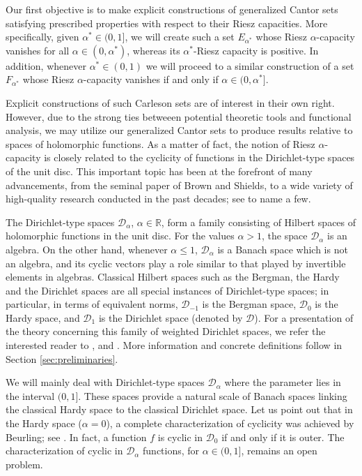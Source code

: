 \documentclass[12pt]{amsart}
\theoremstyle{definition}\newtheorem{remark}[theorem]{Remark}
\theoremstyle{definition}\newtheorem{example}[theorem]{Example}
\theoremstyle{definition}\newtheorem{definition}{Definition}
\numberwithin{equation}{section}
\newcommand\cD{{\mathcal D}}
\newcommand\RR{{\mathbb R}}
\newcommand\DDD{{\mathcal D}}
\begin{document}
Our first objective is to make explicit constructions of generalized Cantor sets satisfying prescribed properties with respect to their Riesz capacities. More specifically, given $\alpha^*\in(0,1]$, we will create such a set $E_{\alpha^*}$ whose Riesz $\alpha$-capacity vanishes for all $\alpha\in (0,\alpha^*)$, whereas its $\alpha^*$-Riesz capacity is positive. In addition, whenever $\alpha^*\in(0,1)$ we will proceed to a similar construction of a set $F_{\alpha^*}$ whose Riesz $\alpha$-capacity vanishes if and only if $\alpha\in(0,\alpha^*]$.

Explicit constructions of such Carleson sets are of interest in their own right. However, due to the strong ties betweeen potential theoretic tools and functional analysis, we may utilize our generalized Cantor sets to produce results relative to spaces of holomorphic functions. As a matter of fact, the notion of Riesz $\alpha$-capacity is closely related to the cyclicity of functions in the Dirichlet-type spaces of the unit disc. This important topic has been at the forefront of many advancements, from the seminal paper \cite{Brown-Shields} of Brown and Shields, to a wide variety of high-quality research conducted in the past decades; see \cite{Brown-Cohn,Primer,EFKR,EFKR2,EFKR*} to name a few. 

The Dirichlet-type spaces $\cD_\alpha$, $\alpha\in \RR$, form a family consisting of Hilbert spaces of holomorphic functions in the unit disc. For the values $\alpha>1$, the space $\cD_\alpha$ is an algebra. On the other hand, whenever $\alpha\leq 1$, $\mathcal{D}_\alpha$ is a Banach space which is not an algebra, and its cyclic vectors play a role similar to that played by invertible elements in algebras.  Classical Hilbert spaces such as the Bergman, the Hardy and the Dirichlet spaces are all special instances of Dirichlet-type spaces; in particular, in terms of equivalent norms, $\cD_{-1}$ is the Bergman space, $\cD_0$ is the Hardy space, and $\cD_1$ is the Dirichlet space (denoted by $\DDD$). For a presentation of the theory concerning this family of weighted Dirichlet spaces, we refer the interested reader to \cite{Aleman1}, \cite{Brown-Shields} and \cite[Chapter 1]{Primer}. More information and concrete definitions follow in Section \ref{sec:preliminaries}.

We will mainly deal with Dirichlet-type spaces $\mathcal{D}_\alpha$ where the parameter lies in the interval $(0,1]$. These spaces provide a natural scale of Banach spaces linking the classical Hardy space to the classical Dirichlet space. Let us point out that in the Hardy space ($\alpha=0$), a complete characterization of cyclicity was achieved by Beurling; see \cite{Beurling}. In fact, a function $f$ is cyclic in $\mathcal{D}_0$ if and only if it is outer. The characterization of cyclic in $\cD_\alpha$ functions, for $\alpha\in (0,1]$, remains an open problem.
\end{document}
